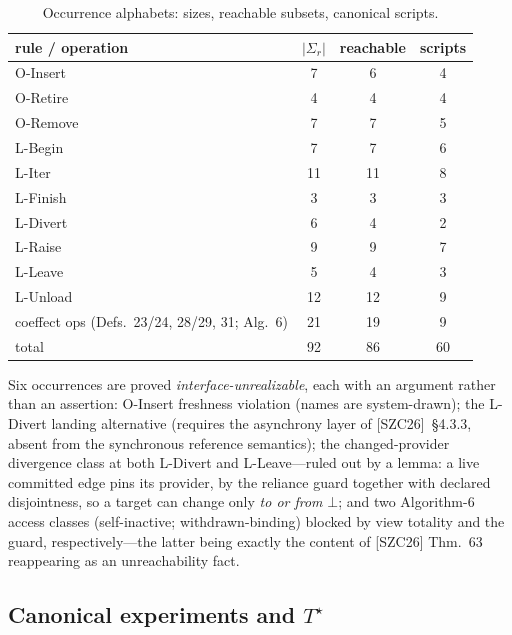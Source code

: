 \documentclass[sigplan,screen,review,nonacm]{acmart}
\newcommand{\Tstar}{\ensuremath{T^{\star}}}
\newcommand{\occ}[1]{\ensuremath{\Sigma_{#1}}}
\newcommand{\SZC}{[SZC26]}
\begin{document}
\begin{table}[t]
\caption{Occurrence alphabets: sizes, reachable subsets, canonical scripts.}
\label{tab:sig}
\centering
\small
\begin{tabular}{lccc}
\toprule
rule / operation & $|\occ r|$ & reachable & scripts \\
\midrule
O-Insert & 7 & 6 & 4 \\
O-Retire & 4 & 4 & 4 \\
O-Remove & 7 & 7 & 5 \\
L-Begin & 7 & 7 & 6 \\
L-Iter & 11 & 11 & 8 \\
L-Finish & 3 & 3 & 3 \\
L-Divert & 6 & 4 & 2 \\
L-Raise & 9 & 9 & 7 \\
L-Leave & 5 & 4 & 3 \\
L-Unload & 12 & 12 & 9 \\
coeffect ops (Defs.~23/24, 28/29, 31; Alg.~6) & 21 & 19 & 9 \\
\midrule
total & 92 & 86 & 60 \\
\bottomrule
\end{tabular}
\end{table}

Six occurrences are proved \emph{interface-unrealizable}, each with an argument
rather than an assertion: O\mbox{-}Insert freshness violation (names are
system-drawn); the L\mbox{-}Divert landing alternative (requires the
asynchrony layer of \SZC{}~\S4.3.3, absent from the synchronous reference
semantics); the changed-provider divergence class at both L\mbox{-}Divert and
L\mbox{-}Leave---ruled out by a lemma: a live committed edge pins its provider,
by the reliance guard together with declared disjointness, so a target can
change only \emph{to or from} $\bot$; and two Algorithm-6 access classes
(self-inactive; withdrawn-binding) blocked by view totality and the guard,
respectively---the latter being exactly the content of \SZC{} Thm.~63
reappearing as an unreachability fact.

\subsection{Canonical experiments and \Tstar}
\end{document}
